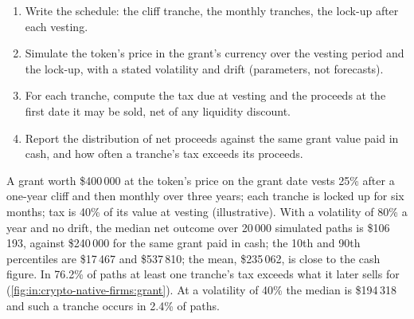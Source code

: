 \begin{method}\label{met:in:crypto-native-firms:grant}
\begin{enumerate}
\item Write the schedule: the cliff tranche, the monthly tranches, the lock-up after each vesting.
\item Simulate the token's price in the grant's currency over the vesting period and the lock-up, with a stated
volatility and drift (parameters, not forecasts).
\item For each tranche, compute the tax due at vesting and the proceeds at the first date it may be sold, net of any
liquidity discount.
\item Report the distribution of net proceeds against the same grant value paid in cash, and how often a tranche's tax
exceeds its proceeds.
\end{enumerate}
\end{method}

\begin{example}\label{ex:in:crypto-native-firms:grant}
A grant worth \$400\,000 at the token's price on the grant date vests 25\% after a one-year cliff and then monthly over
three years; each tranche is locked up for six months; tax is 40\% of its value at vesting (illustrative). With a
volatility of 80\% a year and no drift, the median net outcome over 20\,000 simulated paths is \$106\,193, against \$240\,000
for the same grant paid in cash; the 10th and 90th percentiles are \$17\,467 and \$537\,810; the mean, \$235\,062, is close
to the cash figure. In 76.2\% of paths at least one tranche's tax exceeds what it later sells for
(\cref{fig:in:crypto-native-firms:grant}). At a volatility of 40\% the median is \$194\,318 and such a tranche occurs in
2.4\% of paths.
\end{example}

\begin{omfigure}

\label{fig:in:crypto-native-firms:grant}
\end{omfigure}

